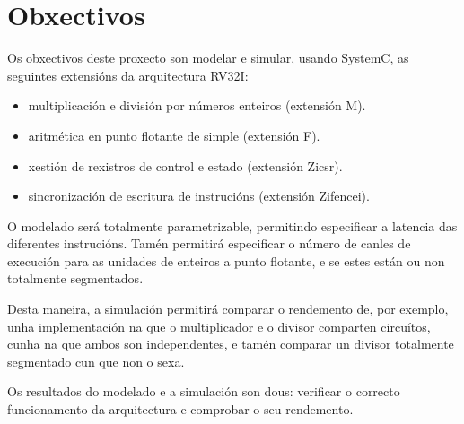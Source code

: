 \section{Obxectivos}
\label{sec:obxectivos}
Os obxectivos deste proxecto son modelar e simular, usando SystemC, as seguintes extensións da arquitectura RV32I: 

\begin{itemize}
    \item multiplicación e división por números enteiros (extensión M).
    \item aritmética en punto flotante de simple (extensión F).
    \item xestión de rexistros de control e estado (extensión Zicsr).
    \item sincronización de escritura de instrucións (extensión Zifencei).
\end{itemize}

O modelado será totalmente parametrizable, permitindo especificar a latencia das diferentes instrucións. Tamén permitirá especificar o número de canles de execución para as unidades de enteiros a punto flotante, e se estes están ou non totalmente segmentados. 

Desta maneira, a simulación permitirá comparar o rendemento de, por exemplo, unha implementación na que o multiplicador e o divisor comparten circuítos, cunha na que ambos son independentes, e tamén comparar un divisor totalmente segmentado cun que non o sexa. 

Os resultados do modelado e a simulación son dous: verificar o correcto funcionamento da arquitectura e comprobar o seu rendemento. 

